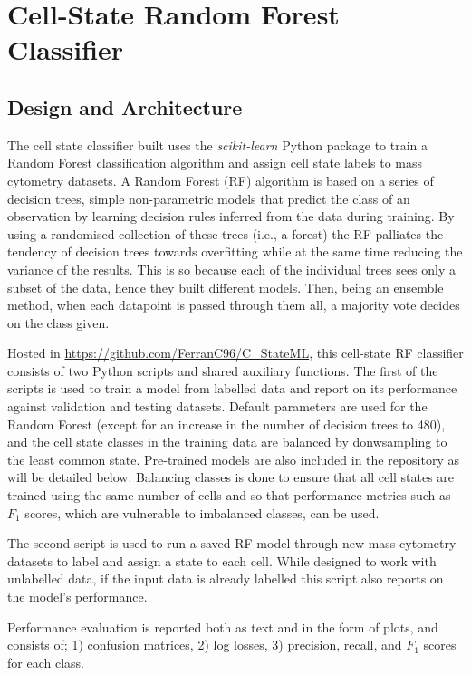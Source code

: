 \newpage
\section{Cell-State Random Forest Classifier}

\subsection{Design and Architecture}

The cell state classifier built uses the \emph{scikit-learn} Python package \cite{pedregosa_scikit-learn_2011} to train a Random Forest classification algorithm and assign cell state labels to mass cytometry datasets. A Random Forest (RF) algorithm is based on a series of decision trees, simple non-parametric models that predict the class of an observation by learning decision rules inferred from the data during training. By using a randomised collection of these trees (i.e., a forest) the RF palliates the tendency of decision trees towards overfitting while at the same time reducing the variance of the results. This is so because each of the individual trees sees only a subset of the data, hence they built different models. Then, being an ensemble method, when each datapoint is passed through them all, a majority vote decides on the class given.

Hosted in \url{https://github.com/FerranC96/C\_StateML}, this cell-state RF classifier consists of two Python scripts and shared auxiliary functions. 
The first of the scripts is used to train a model from labelled data and report on its performance against validation and testing datasets. Default parameters are used for the Random Forest (except for an increase in the number of decision trees to 480), and the cell state classes in the training data are balanced by donwsampling to the least common state. Pre-trained models are also included in the repository as will be detailed below.
Balancing classes is done to ensure that all cell states are trained using the same number of cells and so that performance metrics such as $F_1$ scores, which are vulnerable to imbalanced classes, can be used.

The second script is used to run a saved RF model through new mass cytometry datasets to label and assign a state to each cell. While designed to work with unlabelled data, if the input data is already labelled this script also reports on the model's performance. 

Performance evaluation is reported both as text and in the form of plots, and consists of; 1) confusion matrices, 2) log losses, 3) precision, recall, and $F_1$ scores for each class. 

